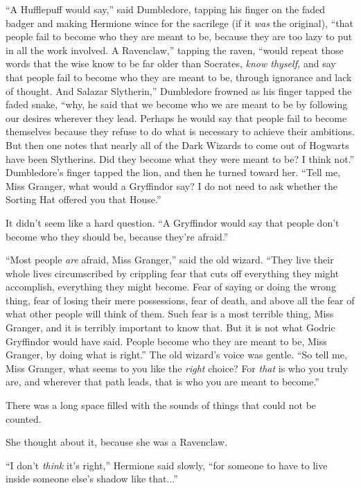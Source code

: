 ``A Hufflepuff would say,'' said Dumbledore, tapping his finger on the faded badger and making Hermione wince for the sacrilege (if it \emph{was} the original), ``that people fail to become who they are meant to be, because they are too lazy to put in all the work involved. A Ravenclaw,'' tapping the raven, ``would repeat those words that the wise know to be far older than Socrates, \emph{know thyself,} and say that people fail to become who they are meant to be, through ignorance and lack of thought. And Salazar Slytherin,'' Dumbledore frowned as his finger tapped the faded snake, ``why, he said that we become who we are meant to be by following our desires wherever they lead. Perhaps he would say that people fail to become themselves because they refuse to do what is necessary to achieve their ambitions. But then one notes that nearly all of the Dark Wizards to come out of Hogwarts have been Slytherins. Did they become what they were meant to be? I think not.'' Dumbledore's finger tapped the lion, and then he turned toward her. ``Tell me, Miss Granger, what would a Gryffindor say? I do not need to ask whether the Sorting Hat offered you that House.''

It didn't seem like a hard question. ``A Gryffindor would say that people don't become who they should be, because they're afraid.''

``Most people \emph{are} afraid, Miss Granger,'' said the old wizard. ``They live their whole lives circumscribed by crippling fear that cuts off everything they might accomplish, everything they might become. Fear of saying or doing the wrong thing, fear of losing their mere possessions, fear of death, and above all the fear of what other people will think of them. Such fear is a most terrible thing, Miss Granger, and it is terribly important to know that. But it is not what Godric Gryffindor would have said. People become who they are meant to be, Miss Granger, by doing what is right.'' The old wizard's voice was gentle. ``So tell me, Miss Granger, what seems to you like the \emph{right} choice? For \emph{that} is who you truly are, and wherever that path leads, that is who you are meant to become.''

There was a long space filled with the sounds of things that could not be counted.

She thought about it, because she was a Ravenclaw.

``I don't \emph{think} it's right,'' Hermione said slowly, ``for someone to have to live inside someone else's shadow like that...''

